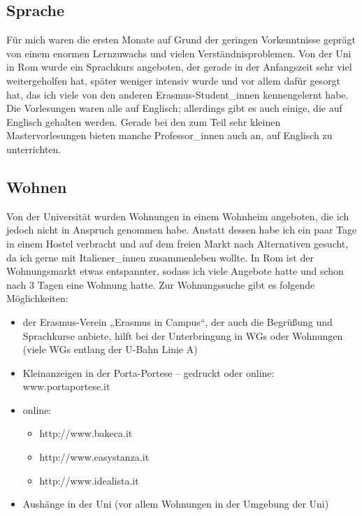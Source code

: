 \documentclass[a4paper,12pt]{article}
\begin{document}
\subsection*{Sprache}
Für mich waren die ersten Monate auf Grund der geringen Vorkenntnisse geprägt von einem enormen Lernzuwachs und vielen Verständnisproblemen. Von der Uni in Rom wurde ein Sprachkurs angeboten, der gerade in der Anfangszeit sehr viel weitergeholfen hat, später weniger intensiv wurde und vor allem dafür gesorgt hat, das ich viele von den anderen Erasmus-Student\_innen kennengelernt habe. Die Vorlesungen waren alle auf Englisch; allerdings gibt es auch einige, die auf Englisch gehalten werden. Gerade bei den zum Teil sehr kleinen Mastervorlesungen bieten manche Professor\_innen auch an, auf Englisch zu unterrichten.  

\subsection*{Wohnen}
Von der Universität wurden Wohnungen in einem Wohnheim angeboten, die ich jedoch nicht in Anspruch genommen habe. Anstatt dessen habe ich ein paar Tage in einem Hostel verbracht und auf dem freien Markt nach Alternativen gesucht, da ich gerne mit Italiener\_innen zusammenleben wollte. In Rom ist der Wohnungsmarkt etwas entspannter, sodass ich viele Angebote hatte und schon nach 3 Tagen eine Wohnung hatte. Zur Wohnungssuche gibt es folgende Möglichkeiten: \\
\begin{itemize}
\item der Erasmus-Verein „Erasmus in Campus“, der auch die Begrüßung und Sprachkurse anbiete, hilft bei der Unterbringung in WGs oder Wohnungen (viele WGs entlang der U-Bahn Linie A)
\item Kleinanzeigen in der Porta-Portese – gedruckt oder online: www.portaportese.it
\item online: \begin{itemize}
	\item http://www.bakeca.it
	\item http://www.easystanza.it
	\item http://www.idealista.it
	\end{itemize}
\item Aushänge in der Uni (vor allem Wohnungen in der Umgebung der Uni) 
\end{itemize}
\end{document}
